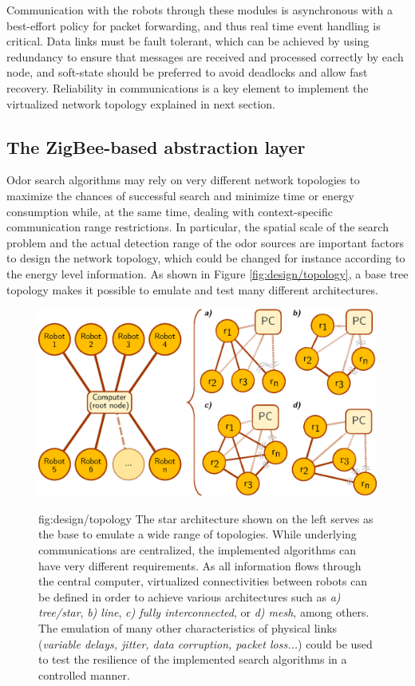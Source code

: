 Communication with the robots through these modules is asynchronous with a best-effort policy for packet forwarding, and thus real time event handling is critical. Data links must be fault tolerant, which can be achieved by using redundancy to ensure that messages are received and processed correctly by each node, and soft-state should be preferred to avoid deadlocks and allow fast recovery.
Reliability in communications is a key element to implement the virtualized network topology explained in next section.


\subsection{The ZigBee-based abstraction layer}

Odor search algorithms may rely on very different network topologies to maximize the chances of successful search and minimize time or energy consumption while, at the same time, dealing with context-specific communication range restrictions. In particular, the spatial scale of the search problem and the actual detection range of the odor sources are important factors to design the network topology, which could be changed for instance according to the energy level information.
As shown in Figure \ref{fig:design/topology}, a base tree topology makes it possible to emulate and test many different architectures.



\begin{figure}[h!]
\centerline{\mbox{\includegraphics[width=15cm]{images/design/topology.eps}}}
{fig:design/topology}{
The star architecture shown on the left serves as the base to emulate a wide range of topologies. While underlying communications are centralized, the implemented algorithms can have very different requirements. As all information flows through the central computer, virtualized connectivities between robots can be defined in order to achieve various architectures such as \emph{a) tree/star}, \emph{b) line}, \emph{c) fully interconnected}, or \emph{d) mesh}, among others. The emulation of many other characteristics of physical links (\emph{variable delays, jitter, data corruption, packet loss...}) could be used to test the resilience of the implemented search algorithms in a controlled manner.
}\end{figure}


